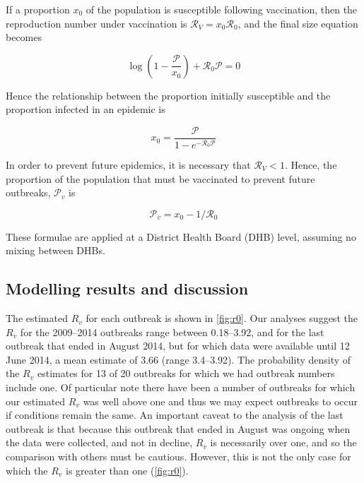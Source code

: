 \documentclass{article}
\newcommand{\Pe}{\mathcal{P}}
\newcommand{\Ro}{\mathcal{R}_0}
\newcommand{\Pv}{\mathcal{P}_v}
\newcommand{\Rr}{\mathcal{R}}
\begin{document}
If a proportion $x_0$ of the population is susceptible following vaccination, then the  reproduction number under vaccination is $\Rr_V=x_0\Ro$, and the final size equation becomes

\begin{equation} \label{eq:eqn2}
\log\left(1-\frac{\Pe}{x_0}\right)+\Ro\Pe=0
\end{equation}

Hence the relationship between the proportion initially susceptible and the proportion infected in an epidemic is

\begin{equation} \label{eq:eqn3}
x_0=\frac{\Pe}{1-e^{-\Ro\Pe}}
\end{equation}

In order to prevent future epidemics, it is necessary that $\Rr_V<1$. Hence, the proportion of the population that must be vaccinated to prevent future outbreaks, $\Pv$ is

\begin{equation} \label{eq:prop}
\Pv = x_0-1/\Ro
\end{equation}

These formulae are applied at a District Health Board (DHB) level, assuming no mixing between DHBs.

\subsection{Modelling results and discussion}

The estimated $R_v$ for each outbreak is shown in \autoref{fig:r0}. Our analyses suggest the $R_v$ for the 2009--2014 outbreaks range between 0.18--3.92, and for the last outbreak that ended in August 2014, but for which data were available until 12 June 2014, a mean estimate of 3.66 (range 3.4--3.92). The probability density of the $R_v$ estimates for 13 of 20 outbreaks for which we had outbreak numbers include one. Of particular note there have been a number of outbreaks for which our estimated $R_v$ was well above one and thus we may expect outbreaks to occur if conditions remain the same. An important caveat to the analysis of the last outbreak is that because this outbreak that ended in August was ongoing when the data were collected, and not in decline, $R_v$ is necessarily over one, and so the comparison with others must be cautious. However, this is not the only case for which the $R_v$ is greater than one (\autoref{fig:r0}).
\end{document}

